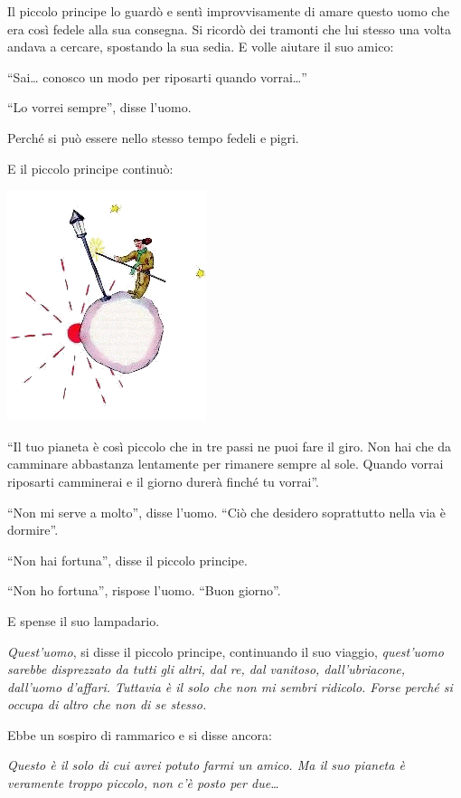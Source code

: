 \documentclass[11pt]{scrbook}
\begin{document}
Il piccolo principe lo guardò e sentì improvvisamente di amare questo uomo che era così fedele alla sua consegna. Si ricordò dei tramonti che lui stesso una volta andava a cercare, spostando la sua sedia. E volle aiutare il suo amico:

``Sai\ldots{} conosco un modo per riposarti quando vorrai\ldots{}''

``Lo vorrei sempre'', disse l'uomo.

Perché si può essere nello stesso tempo fedeli e pigri.

E il piccolo principe continuò:

\begin{center}
\includegraphics{img/14a}
\end{center}

``Il tuo pianeta è così piccolo che in tre passi ne puoi fare il giro. Non hai che da camminare abbastanza lentamente per rimanere sempre al sole. Quando vorrai riposarti camminerai e il giorno durerà finché tu vorrai''.

``Non mi serve a molto'', disse l'uomo. ``Ciò che desidero soprattutto nella via è dormire''.

``Non hai fortuna'', disse il piccolo principe.

``Non ho fortuna'', rispose l'uomo. ``Buon giorno''.

E spense il suo lampadario.

\emph{Quest'uomo}, si disse il piccolo principe, continuando il suo viaggio, \emph{quest'uomo sarebbe disprezzato da tutti gli altri, dal re, dal vanitoso, dall'ubriacone, dall'uomo d'affari. Tuttavia è il solo che non mi sembri ridicolo. Forse perché si occupa di altro che non di se stesso.}

Ebbe un sospiro di rammarico e si disse ancora:

\emph{Questo è il solo di cui avrei potuto farmi un amico. Ma il suo pianeta è veramente troppo piccolo, non c'è posto per due\ldots{}}
\end{document}
